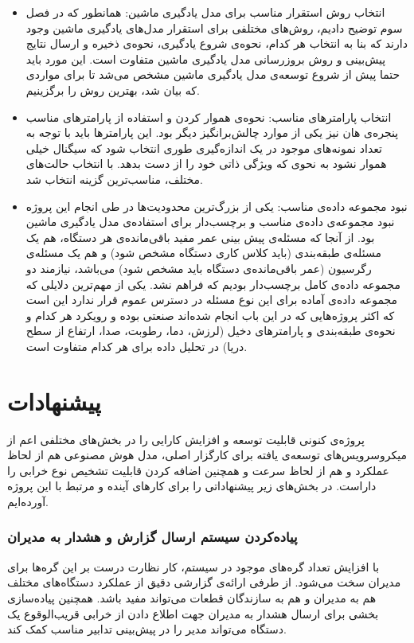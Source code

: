 \begin{itemize}

\item انتخاب روش استقرار مناسب برای مدل یادگیری ماشین: همانطور که در فصل سوم توضیح دادیم، روش‌های مختلفی برای استقرار مدل‌های یادگیری ماشین وجود دارند که بنا به انتخاب هر کدام، نحوه‌ی شروع یادگیری، نحوه‌ی ذخیره‌ و ارسال نتایج پیش‌بینی و روش بروزرسانی مدل یادگیری ماشین متفاوت است. این مورد باید حتما پیش از شروع توسعه‌ی مدل یادگیری ماشین مشخص می‌شد تا برای مواردی که بیان شد، بهترین روش را برگزینیم.

\item انتخاب پارامتر‌های مناسب: نحوه‌ی هموار کردن و استفاده از پارامترهای مناسب پنجره‌ی هان نیز یکی از موارد چالش‌برانگیز دیگر بود. این پارامترها باید با توجه به تعداد نمونه‌های موجود در یک اندازه‌گیری طوری  انتخاب شود که سیگنال خیلی هموار نشود به نحوی که ویژگی ذاتی خود را از دست بدهد. با انتخاب حالت‌های مختلف، مناسب‌ترین گزینه انتخاب شد.

\item نبود مجموعه داده‌ی مناسب: یکی از بزرگ‌ترین محدودیت‌ها در طی انجام این پروژه نبود مجموعه‌ی داده‌‌ی مناسب و برچسب‌دار برای استفاده‌ی مدل یادگیری ماشین بود. از آنجا که مسئله‌ی پیش بینی عمر مفید باقی‌مانده‌ی هر دستگاه، هم یک مسئله‌ی طبقه‌بندی (باید کلاس کاری دستگاه مشخص شود) و هم یک مسئله‌ی رگرسیون (عمر باقی‌مانده‌ی دستگاه باید مشخص شود) می‌باشد، نیازمند دو مجموعه داده‌ی کامل برچسب‌دار بودیم که فراهم نشد. یکی از مهم‌ترین دلایلی که مجموعه داده‌ی آماده برای این نوع مسئله در دسترس عموم قرار ندارد این است که اکثر پروژه‌هایی که در این باب انجام شده‌اند صنعتی بوده و رویکرد هر کدام و نحوه‌ی طبقه‌بندی و پارامترهای دخیل (لرزش، دما، رطوبت، صدا، ارتفاع از سطح دریا) در تحلیل داده برای هر کدام متفاوت است.

\end{itemize}


\section{پیشنهادات}

پروژه‌ی کنونی قابلیت توسعه و افزایش کارایی را در بخش‌های مختلفی اعم از میکروسرویس‌های توسعه‌ی یافته برای کارگزار اصلی، مدل هوش مصنوعی هم از لحاظ عملکرد و هم از لحاظ سرعت و همچنین اضافه کردن قابلیت تشخیص نوع خرابی را داراست. در بخش‌های زیر پیشنهاداتی را برای کارهای آینده و مرتبط با این پروژه آورده‌ایم.

\subsubsection{پیاده‌کردن سیستم ارسال گزارش و هشدار به مدیران}
با افزایش تعداد گره‌های موجود در سیستم، کار نظارت درست بر این گره‌ها برای مدیران سخت می‌شود. از طرفی ارائه‌ی گزارشی دقیق از عملکرد دستگاه‌های مختلف هم به مدیران و هم به سازندگان قطعات می‌تواند مفید باشد. همچنین پیاده‌سازی بخشی برای ارسال هشدار به مدیران جهت اطلاع دادن از خرابی قریب‌الوقوع یک دستگاه می‌تواند مدیر را در پیش‌بینی تدابیر مناسب کمک کند.

